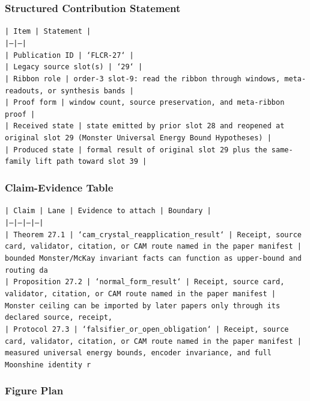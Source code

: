 \documentclass[11pt]{article}
\begin{document}
\subsubsection*{Structured Contribution Statement}

\noindent\texttt{| Item | Statement |}\\
\noindent\texttt{|---|---|}\\
\noindent\texttt{| Publication ID | `FLCR-27` |}\\
\noindent\texttt{| Legacy source slot(s) | `29` |}\\
\noindent\texttt{| Ribbon role | order-3 slot-9: read the ribbon through windows, meta-readouts, or synthesis bands |}\\
\noindent\texttt{| Proof form | window count, source preservation, and meta-ribbon proof |}\\
\noindent\texttt{| Received state | state emitted by prior slot 28 and reopened at original slot 29 (Monster Universal Energy Bound Hypotheses) |}\\
\noindent\texttt{| Produced state | formal result of original slot 29 plus the same-family lift path toward slot 39 |}\\

\subsubsection*{Claim-Evidence Table}

\noindent\texttt{| Claim | Lane | Evidence to attach | Boundary |}\\
\noindent\texttt{|---|---|---|---|}\\
\noindent\texttt{| Theorem 27.1 | `cam\_crystal\_reapplication\_result` | Receipt, source card, validator, citation, or CAM route named in the paper manifest | bounded Monster/McKay invariant facts can function as upper-bound and routing da}\\
\noindent\texttt{| Proposition 27.2 | `normal\_form\_result` | Receipt, source card, validator, citation, or CAM route named in the paper manifest | Monster ceiling can be imported by later papers only through its declared source, receipt,}\\
\noindent\texttt{| Protocol 27.3 | `falsifier\_or\_open\_obligation` | Receipt, source card, validator, citation, or CAM route named in the paper manifest | measured universal energy bounds, encoder invariance, and full Moonshine identity r}\\

\subsubsection*{Figure Plan}
\end{document}
